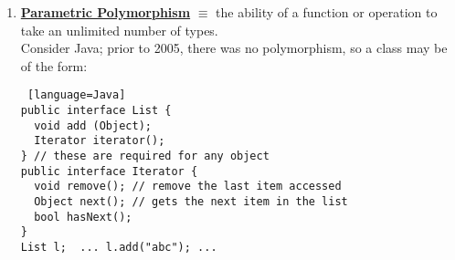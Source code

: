 \documentclass[../../lecture_notes.tex]{subfiles}
\begin{document}
\begin{enumerate} [itemsep=0mm]
\begin{enumerate} [itemsep=0mm]
\begin{itemize} [itemsep=0mm]
					\item does not accept \{char, uchar, short, ushort\}.
				\end{itemize}
				We would thus expect to have 196 variations of the operator, but with coercion we only need 4.\\
				This is because coercion follows the following rules:
				\begin{itemize} [itemsep=0mm]
					\item if sizeof(T) < sizeof(int), then cast T to int.
					\item if sizeof($T_1$) > sizeof($T_2$), cast $T_1$ to type($T_2$).
					\item else, cast both numbers to unsigned.
				\end{itemize}
				This can result in some unexpected behavior:
				\begin{lstlisting}[language=C]
int i, j; 
long l; 
i = j + l; // trap
// sometimes the values can even change
int i = -1;
unsigned j = i; // changed value; j == UINT_MAX
unsigned short k = i; // loses info
assert(i == j);
// this can even happen implicitly on comparison
int i = -1;
unsigned z = 0;
assert(i < z); // EXCEPTION -- i is converted to unsigned
// even literals are not immune to this behavior
assert(-1 < 2^34); // EXCEPTION -- 2^34 is converted to int, where it overflows
assert(-2^32 < 0); // EXCEPTION -- 2^32 is converted to unsigned, then negated, 
		   // but since it is unsigned, it is still nonnegative
				\end{lstlisting}
		\end{enumerate}
		These two types of ad-hoc polymorphism can interact to cause undefined behavior:
		\begin{lstlisting} [language=C]
inf f(double x, int y);
int f(int x, double y);
f(3, 5); // which one does it call? 
		\end{lstlisting}
	\item \textbf{\underline{Parametric Polymorphism}}
		$\equiv$ the ability of a function or operation to take an unlimited number of types.\\
		Consider Java; prior to 2005, there was no polymorphism, so a class may be of the form:
		\begin{lstlisting} [language=Java]
public interface List {
  void add (Object);
  Iterator iterator();
} // these are required for any object
public interface Iterator {
  void remove(); // remove the last item accessed
  Object next(); // gets the next item in the list
  bool hasNext();
} 
List l;  ... l.add("abc"); ...

\end{lstlisting}
\end{enumerate}
\end{document}
